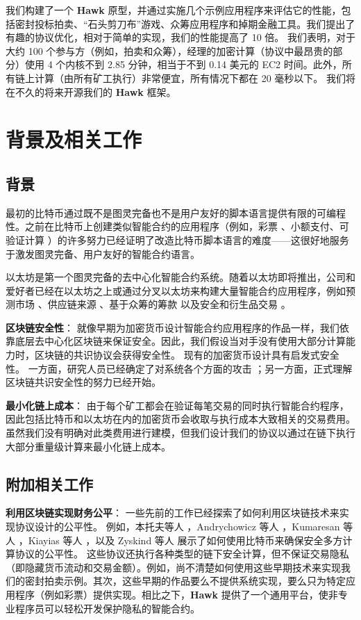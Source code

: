 \documentclass{xduugtrans}
\begin{document}
我们构建了一个 \textbf{Hawk} 原型，并通过实施几个示例应用程序来评估它的性能，包括密封投标拍卖、“石头剪刀布”游戏、众筹应用程序和掉期金融工具。我们提出了有趣的协议优化，相对于简单的实现，我们的性能提高了 10 倍。 我们表明，对于大约 100 个参与方（例如，拍卖和众筹），经理的加密计算（协议中最昂贵的部分）使用 4 个内核不到 2.85 分钟，相当于不到 0.14 美元的 EC2 时间。此外，所有链上计算（由所有矿工执行）非常便宜，所有情况下都在 20 毫秒以下。 我们将在不久的将来开源我们的 \textbf{Hawk} 框架。

\section{背景及相关工作}

\subsection{背景}

最初的比特币通过既不是图灵完备也不是用户友好的脚本语言提供有限的可编程性。之前在比特币上创建类似智能合约的应用程序（例如，彩票 \cite{ref7}\cite{ref17}、小额支付\cite{ref4}、可验证计算 \cite{ref40}）的许多努力已经证明了改造比特币脚本语言的难度——这很好地服务于激发图灵完备、用户友好的智能合约语言。

以太坊是第一个图灵完备的去中心化智能合约系统。随着以太坊即将推出，公司和爱好者已经在以太坊之上或通过分叉以太坊来构建大量智能合约应用程序，例如预测市场 \cite{ref3}、供应链来源 \cite{ref6}、基于众筹的筹款 \cite{ref1} 以及安全和衍生品交易 \cite{ref28}。

\textbf{区块链安全性}：
就像早期为加密货币设计智能合约应用程序的作品一样，我们依靠底层去中心化区块链来保证安全。因此，我们假设当对手没有使用大部分计算能力时，区块链的共识协议会获得安全性。 现有的加密货币设计具有启发式安全性。 一方面，研究人员已经确定了对系统各个方面的攻击 \cite{ref29}\cite{ref34}；另一方面，正式理解区块链共识安全性的努力已经开始\cite{ref32}\cite{ref45}。

\textbf{最小化链上成本}：
由于每个矿工都会在验证每笔交易的同时执行智能合约程序，因此包括比特币和以太坊在内的加密货币会收取与执行成本大致相关的交易费用。虽然我们没有明确对此类费用进行建模，但我们设计我们的协议以通过在链下执行大部分重量级计算来最小化链上成本。

\subsection{附加相关工作}

\textbf{利用区块链实现财务公平}：
一些先前的工作已经探索了如何利用区块链技术来实现协议设计的公平性。 例如，本托夫等人 \cite{ref17}，Andrychowicz 等人 \cite{ref7}，Kumaresan 等人 \cite{ref40}，Kiayias 等人 \cite{ref36}，以及 Zyskind 等人 \cite{ref59}展示了如何使用比特币来确保安全多方计算协议的公平性。 这些协议还执行各种类型的链下安全计算，但不保证交易隐私（即隐藏货币流动和交易金额）。例如，尚不清楚如何使用这些早期技术来实现我们的密封拍卖示例。其次，这些早期的作品要么不提供系统实现，要么只为特定应用程序（例如彩票）提供实现。相比之下，\textbf{Hawk} 提供了一个通用平台，使非专业程序员可以轻松开发保护隐私的智能合约。
\end{document}
